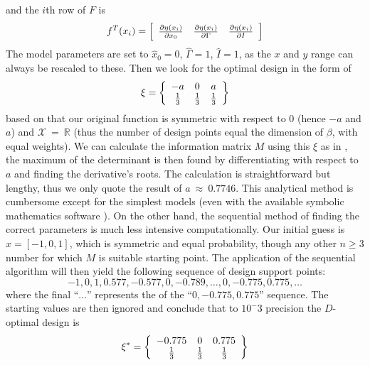 \documentclass[12pt]{iopart}
\begin{document}
 and the $i$th row of $F$ is
\begin{equation}
 f^T(x_i) = \left[
  \begin{array}{l l l}
   \frac{\partial \eta(x_i)}{\partial x_0} & \frac{\partial \eta(x_i)}{\partial \Gamma} & \frac{\partial \eta(x_i)}{\partial I}
  \end{array} \right ]
\end{equation}
The model parameters are set to $\hat x_0 = 0$, $\hat \Gamma = 1$, $\hat I = 1$, as the $x$ and $y$ range can always be rescaled to these. Then we look for the optimal design in the form of
\begin{equation}
\xi = \left\{
  \begin{array}{c c c}
    -a & 0 & a\\
    \frac{1}{3} & \frac{1}{3} & \frac{1}{3}\\
  \end{array} \right \}
\end{equation}
based on that our original function is symmetric with respect to 0 (hence $-a$ and $a$) and $\mathcal{X}~=~\mathbb{R}$ (thus the number of design points equal the dimension of $\beta$, with equal weights). We can calculate the information matrix $M$ using this $\xi$ as in , the maximum of the determinant is then found by differentiating with respect to $a$ and finding the derivative's roots. The calculation is straightforward but lengthy, thus we only quote the result of $a~\approx~0.7746$. This analytical method is cumbersome except for the simplest models (even with the available symbolic mathematics software \cite{symmath}). On the other hand, the sequential method of finding the correct parameters is much less intensive computationally. Our initial guess is $x = [-1, 0, 1]$, which is symmetric and equal probability, though any other $n \geq 3$ number for which $M$ is suitable starting point. The application of the sequential algorithm will then yield the following sequence of design support points:
\begin{equation}
    -1, 0, 1, 0.577, -0.577, 0, -0.789,\ldots,0,-0.775,0.775,\ldots
\label{eq:l3seq}
\end{equation}
where the final ``$\ldots$'' represents the  of the ``$0,-0.775,0.775$'' sequence. The starting values are then ignored and conclude that to $10^-3$ precision the $D$-optimal design is
\begin{equation}
\xi^* = \left\{
  \begin{array}{c c c}
    -0.775 & 0 & 0.775\\
    \frac{1}{3} & \frac{1}{3} & \frac{1}{3}\\
  \end{array} \right \}
\label{eq:lorentzxi1}
\end{equation}
\end{document}
